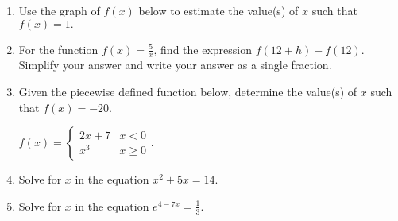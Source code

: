 \documentclass[12pt]{article}
\begin{document}
\begin{enumerate}
\quad \hfill \underline{\hspace{2in}}
\vfill

\item Use the graph of $f(x)$ below to estimate the value(s) of $x$ such that $f(x)=1.$

\quad \hfill \underline{\hspace{2in}}

\item For the function $f(x)=\frac{5}{x}$, find the expression $f(12+h)-f(12).$ Simplify your answer and write your answer as a single fraction.\\


\quad \hfill \underline{\hspace{2in}}
\vfill

\item Given the piecewise defined function below, determine the value(s) of $x$ such that $f(x)=-20.$

$f(x)=\begin{cases} 2x+7 & x <0 \\ x^3 & x \geq 0 \end{cases}.$\\

\quad \hfill \underline{\hspace{2in}}
\vfill


\item Solve for $x$ in the equation $x^{2}+ 5x = 14$. %

\quad \hfill \underline{\hspace{2in}}
\vfill

\newpage
\item Solve for $x$ in the equation $e^{4-7x}=\frac{1}{3}.$



\end{enumerate}
\end{document}

